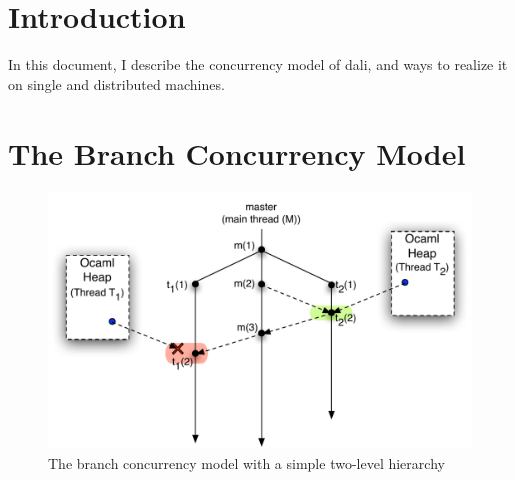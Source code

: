 \section{Introduction}

In this document, I describe the concurrency model of dali, and ways
to realize it on single and distributed machines.

\section{The Branch Concurrency Model}

\begin{figure}[ht]

\includegraphics[scale=0.75]{Figures/sync-1}

\caption{The branch concurrency model with a simple two-level
hierarchy}
\label{fig:sync-1}
\end{figure}

